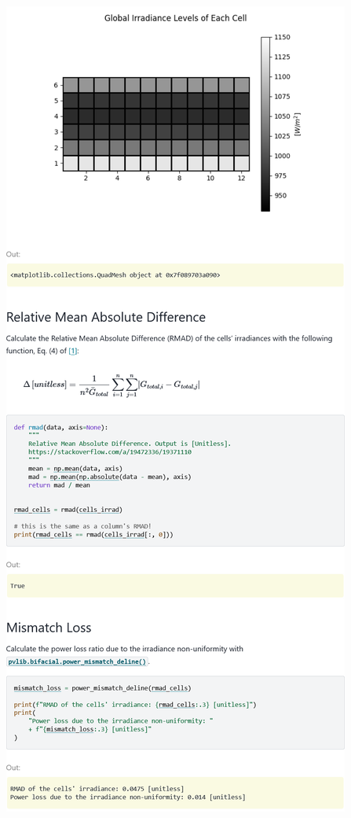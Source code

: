\begin{myparindent}{0pt}
\includegraphics[width=\linewidth,height=0.9\textheight,keepaspectratio]{images/docs_examples_cut/nonuniformity_1.png}


\end{myparindent}
